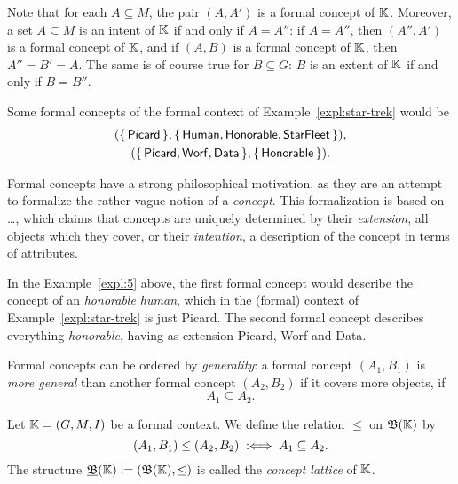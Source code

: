 Note that for each $A \subseteq M$, the pair $(A, A')$ is a formal concept of ${\mathbb{K}}$.
Moreover, a set $A \subseteq M$ is an intent of ${\mathbb{K}}$ if and only if $A = A''$: if $A =
A''$, then $(A'', A')$ is a formal concept of ${\mathbb{K}}$, and if $(A, B)$ is a formal
concept of ${\mathbb{K}}$, then $A'' = B' = A$.  The same is of course true for $B \subseteq G$:
$B$ is an extent of ${\mathbb{K}}$ if and only if $B = B''$.

\begin{Example}
  \label{expl:5}
  Some formal concepts of the formal context of Example~\ref{expl:star-trek} would be
  \begin{gather*}
    ({\{\,\mathsf{Picard}\,\}}, {\{\,\mathsf{Human}, \mathsf{Honorable},
      \mathsf{StarFleet}\,\}}),\\
    ({\{\,\mathsf{Picard}, \mathsf{Worf}, \mathsf{Data}\,\}}, {\{\,\mathsf{Honorable}\,\}}).
  \end{gather*}
\end{Example}

Formal concepts have a strong philosophical motivation, as they are an attempt to
formalize the rather vague notion of a \emph{concept}.  This formalization is based on
\dots{}, which claims that concepts are uniquely
determined by their \emph{extension}, \ie all objects which they cover, or their
\emph{intention}, a description of the concept in terms of attributes.

In the Example~\ref{expl:5} above, the first formal concept would describe the concept of
an \emph{honorable human}, which in the (formal) context of Example~\ref{expl:star-trek}
is just \textsf{Picard}.  The second formal concept describes everything \emph{honorable},
having as extension \textsf{Picard}, \textsf{Worf} and \textsf{Data}.

Formal concepts can be ordered by \emph{generality}: a formal concept $(A_1, B_1)$ is
\emph{more general} than another formal concept $(A_2, B_2)$ if it covers more objects,
\ie if
\begin{equation*}
  A_1 \subseteq A_2.
\end{equation*}

\begin{Definition}
  \label{def:concept-lattice}
  Let ${\mathbb{K}} = (G, M, I)$ be a formal context.  We define the relation $\le$ on $\operatorname{{\mathfrak{B}}}({\mathbb{K}})$ by
  \begin{equation*}
    (A_1, B_1) \leq (A_2, B_2) \;:\Longleftrightarrow\; A_1 \subseteq A_2.
  \end{equation*}
  The structure ${\underline{\operatorname{{\mathfrak{B}}}}}({\mathbb{K}}) := (\operatorname{{\mathfrak{B}}}({\mathbb{K}}), \leq)$ is called the \emph{concept
    lattice} of ${\mathbb{K}}$.
\end{Definition}

